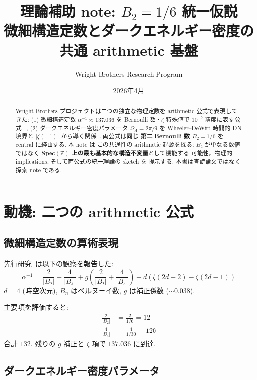 \documentclass[11pt,a4paper]{article}
\title{理論補助 note: $B_2 = 1/6$ 統一仮説\\
\large 微細構造定数とダークエネルギー密度の共通 arithmetic 基盤}
\author{Wright Brothers Research Program}
\date{2026年4月}
\begin{document}
\maketitle

\begin{abstract}
Wright Brothers プロジェクトは二つの独立な物理定数を arithmetic
公式で表現してきた: (1) 微細構造定数 $\alpha^{-1} \approx 137.036$ を
Bernoulli 数・$\zeta$ 特殊値で $10^{-7}$ 精度に表す公式
~\cite{alphaArithmetic}, (2) ダークエネルギー密度パラメータ
$\Omega_\Lambda = 2\pi/9$ を Wheeler--DeWitt 時間的 DN 境界と
$|\zeta(-1)|$ から導く関係~\cite{WDW-DN-paper}. 両公式は\textbf{同じ
第二 Bernoulli 数 $B_2 = 1/6$} を central に経由する. 本 note は
この共通性の arithmetic 起源を探る: $B_2$ が単なる数値ではなく
\textbf{Spec$(\mathbb{Z})$ 上の最も基本的な構造不変量}として機能する
可能性，物理的 implications, そして両公式の統一理論の sketch を
提示する. 本書は査読論文ではなく探索 note である.
\end{abstract}

\tableofcontents

\section{動機: 二つの arithmetic 公式}

\subsection{微細構造定数の算術表現}

先行研究~\cite{alphaArithmetic}は以下の観察を報告した:
\begin{equation}\label{eq:alpha-formula}
\alpha^{-1} = \frac{2}{|B_2|} + \frac{4}{|B_4|}
+ g\left(\frac{2}{|B_2|} + \frac{4}{|B_4|}\right)
+ d(\zeta(2d{-}2) - \zeta(2d{-}1))
\end{equation}
$d = 4$ (時空次元), $B_n$ はベルヌーイ数, $g$ は補正係数 ($\sim 0.038$).

主要項を評価すると:
\begin{align}
\frac{2}{|B_2|} &= \frac{2}{1/6} = 12\\
\frac{4}{|B_4|} &= \frac{4}{1/30} = 120
\end{align}
合計 $132$. 残りの $g$ 補正と $\zeta$ 項で $137.036$ に到達.

\subsection{ダークエネルギー密度パラメータ}
\end{document}
